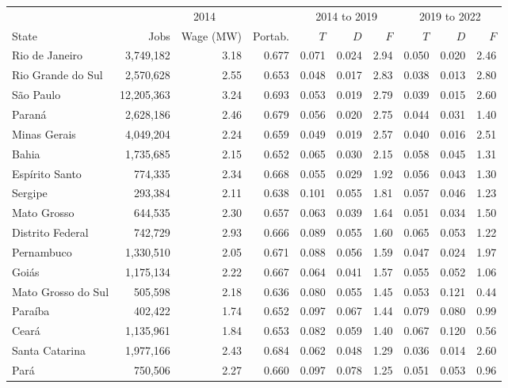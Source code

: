 {\footnotesize
\begin{threeparttable}
\begin{tabular}{lrrrrrrrrr}
\toprule
 & \multicolumn{3}{c}{2014} & \multicolumn{3}{c}{2014 to 2019} & \multicolumn{3}{c}{2019 to 2022} \\
\cmidrule(lr){2-4}\cmidrule(lr){5-7}\cmidrule(lr){8-10}
State & Jobs & Wage (MW) & Portab. & $T$ & $D$ & $F$ & $T$ & $D$ & $F$ \\
\midrule
Rio de Janeiro & 3,749,182 & 3.18 & 0.677 & 0.071 & 0.024 & 2.94 & 0.050 & 0.020 & 2.46 \\
Rio Grande do Sul & 2,570,628 & 2.55 & 0.653 & 0.048 & 0.017 & 2.83 & 0.038 & 0.013 & 2.80 \\
São Paulo & 12,205,363 & 3.24 & 0.693 & 0.053 & 0.019 & 2.79 & 0.039 & 0.015 & 2.60 \\
Paraná & 2,628,186 & 2.46 & 0.679 & 0.056 & 0.020 & 2.75 & 0.044 & 0.031 & 1.40 \\
Minas Gerais & 4,049,204 & 2.24 & 0.659 & 0.049 & 0.019 & 2.57 & 0.040 & 0.016 & 2.51 \\
Bahia & 1,735,685 & 2.15 & 0.652 & 0.065 & 0.030 & 2.15 & 0.058 & 0.045 & 1.31 \\
Espírito Santo & 774,335 & 2.34 & 0.668 & 0.055 & 0.029 & 1.92 & 0.056 & 0.043 & 1.30 \\
Sergipe & 293,384 & 2.11 & 0.638 & 0.101 & 0.055 & 1.81 & 0.057 & 0.046 & 1.23 \\
Mato Grosso & 644,535 & 2.30 & 0.657 & 0.063 & 0.039 & 1.64 & 0.051 & 0.034 & 1.50 \\
Distrito Federal & 742,729 & 2.93 & 0.666 & 0.089 & 0.055 & 1.60 & 0.065 & 0.053 & 1.22 \\
Pernambuco & 1,330,510 & 2.05 & 0.671 & 0.088 & 0.056 & 1.59 & 0.047 & 0.024 & 1.97 \\
Goiás & 1,175,134 & 2.22 & 0.667 & 0.064 & 0.041 & 1.57 & 0.055 & 0.052 & 1.06 \\
Mato Grosso do Sul & 505,598 & 2.18 & 0.636 & 0.080 & 0.055 & 1.45 & 0.053 & 0.121 & 0.44 \\
Paraíba & 402,422 & 1.74 & 0.652 & 0.097 & 0.067 & 1.44 & 0.079 & 0.080 & 0.99 \\
Ceará & 1,135,961 & 1.84 & 0.653 & 0.082 & 0.059 & 1.40 & 0.067 & 0.120 & 0.56 \\
Santa Catarina & 1,977,166 & 2.43 & 0.684 & 0.062 & 0.048 & 1.29 & 0.036 & 0.014 & 2.60 \\
Pará & 750,506 & 2.27 & 0.660 & 0.097 & 0.078 & 1.25 & 0.051 & 0.053 & 0.96 \\

\end{tabular}
\end{threeparttable}}
